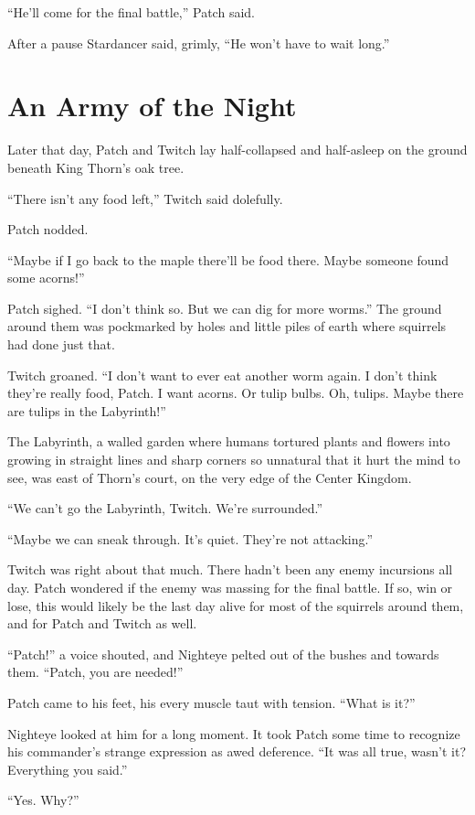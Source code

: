 \documentclass[ebook,oneside,openany,12pt]{memoir}
\begin{document}
“He’ll come for the final battle,” Patch said.

After a pause Stardancer said, grimly, “He won’t have to wait long.”


\section{An Army of the Night}

Later that day, Patch and Twitch lay half-collapsed and half-asleep on
the ground beneath King Thorn’s oak tree.

“There isn’t any food left,” Twitch said dolefully.

Patch nodded.

“Maybe if I go back to the maple there’ll be food there. Maybe someone
found some acorns!”

Patch sighed. “I don’t think so. But we can dig for more worms.” The
ground around them was pockmarked by holes and little piles of earth
where squirrels had done just that.

Twitch groaned. “I don’t want to ever eat another worm again. I don’t
think they’re really food, Patch. I want acorns. Or tulip bulbs. Oh,
tulips. Maybe there are tulips in the Labyrinth!”

The Labyrinth, a walled garden where humans tortured plants and
flowers into growing in straight lines and sharp corners so unnatural
that it hurt the mind to see, was east of Thorn’s court, on the very
edge of the Center Kingdom.

“We can’t go the Labyrinth, Twitch. We’re surrounded.”

“Maybe we can sneak through. It’s quiet. They’re not attacking.”

Twitch was right about that much. There hadn’t been any enemy
incursions all day. Patch wondered if the enemy was massing for the
final battle. If so, win or lose, this would likely be the last day
alive for most of the squirrels around them, and for Patch and Twitch
as well.

“Patch!” a voice shouted, and Nighteye pelted out of the bushes and
towards them. “Patch, you are needed!”

Patch came to his feet, his every muscle taut with tension. “What is
it?”

Nighteye looked at him for a long moment. It took Patch some time to
recognize his commander’s strange expression as awed deference. “It
was all true, wasn’t it? Everything you said.”

“Yes. Why?”
\end{document}
